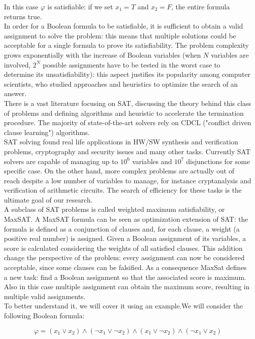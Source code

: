 In this case $\varphi$ is satisfiable: if we set $x_1 = T$ and $x_2 = F$, the entire formula returns true. \\
In order for a Boolean formula to be satisfiable, it is sufficient to obtain a valid assignment to solve the problem: this means that multiple solutions could be acceptable for a single formula to prove its satisfiability. The problem complexity grows exponentially with the increase of Boolean variables (when $N$ variables are involved, $2^N$ possible assignments have to be tested in the worst case to determine its unsatisfiability): this aspect justifies its popularity among computer scientists, who studied approaches and heuristics to optimize the search of an answer. \\
There is a vast literature focusing on SAT, discussing the theory behind this class of problems and defining algorithms and heuristic to accelerate the termination procedure. The majority of state-of-the-art solvers rely on CDCL ("conflict driven clause learning") algorithms. \\
SAT solving found real life applications in HW/SW synthesis and verification problems, cryptography and security issues and many other tasks. Currently SAT solvers are capable of managing up to $10^6$ variables and $10^7$ disjunctions for some specific case. On the other hand, more complex problems are actually out of reach despite a low number of variables to manage, for instance cryptanalysis and verification of arithmetic circuits. The search of efficiency for these tasks is the ultimate goal of our research. \\
A subclass of SAT problems is called weighted maximum satisfiability, or MaxSAT. A MaxSAT formula can be seen as optimization extension of SAT: the formula is defined as a conjunction of clauses and, for each clause, a weight (a positive real number) is assigned. Given a Boolean assignment of its variables, a score is calculated considering the weights of all satisfied clauses. This addition change the perspective of the problem: every assignment can now be considered acceptable, since some clauses can be falsified. As a consequence MaxSat defines a new task: find a Boolean assignment so that the associated score is maximum. Also in this case multiple assignment can obtain the maximum score, resulting in multiple valid assignments. \\
To better understand it, we will cover it using an example.We will consider the following Boolean formula:

\begin{equation}
    \varphi = ( x_1 \vee x_2) \wedge (\neg x_1 \vee \neg x_2) \wedge ( x_1 \vee \neg x_2) \wedge (\neg x_1 \vee x_2)
\end{equation}

